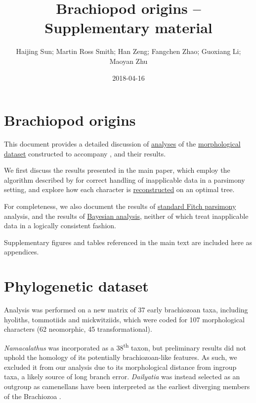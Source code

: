 \documentclass[openany]{book}
\title{Brachiopod origins -- Supplementary material}
\author{Haijing Sun; Martin Ross Smith; Han Zeng; Fangchen Zhao; Guoxiang Li;
Maoyan Zhu}
\date{2018-04-16}
\theoremstyle{definition}
\theoremstyle{definition}
\theoremstyle{definition}
\theoremstyle{remark}
\begin{document}
\maketitle

{
\setcounter{tocdepth}{1}
\tableofcontents
}
\hypertarget{brachiopod-origins}{%
\chapter*{Brachiopod origins}\label{brachiopod-origins}}

This document provides a detailed discussion of
\protect\hyperlink{treesearch}{analyses} of the
\protect\hyperlink{dataset}{morphological dataset} constructed to
accompany \citet{Sun2018Hyolithswith}, and their results.

We first discuss the results presented in the main paper, which employ
the algorithm described by \citet{Brazeau2018} for correct handling of
inapplicable data in a parsimony setting, and explore how each character
is \protect\hyperlink{reconstructions}{reconstructed} on an optimal
tree.

For completeness, we also document the results of
\protect\hyperlink{fitch}{standard Fitch parsimony} analysis, and the
results of \protect\hyperlink{bayesian}{Bayesian analysis}, neither of
which treat inapplicable data in a logically consistent fashion.

Supplementary figures and tables referenced in the main text are
included here as appendices.

\hypertarget{dataset}{%
\chapter{Phylogenetic dataset}\label{dataset}}

Analysis was performed on a new matrix of 37 early brachiozoan taxa,
including hyoliths, tommotiids and mickwitziids, which were coded for
107 morphological characters (62 neomorphic, 45 transformational).

\emph{Namacalathus} was incorporated as a 38\textsuperscript{th} taxon,
but preliminary results did not uphold the homology of its potentially
brachiozoan-like features. As such, we excluded it from our analysis due
to its morphological distance from ingroup taxa, a likely source of long
branch error. \emph{Dailyatia} was instead selected as an outgroup as
camenellans have been interpreted as the earliest diverging members of
the Brachiozoa \citep{Skovsted2015Theearly, Zhao2017}.
\end{document}
